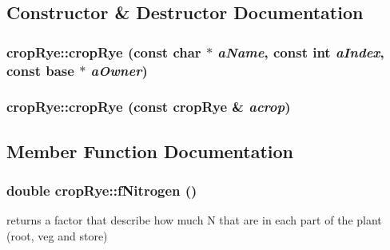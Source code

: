 \subsection{Constructor \& Destructor Documentation}
\hypertarget{classcrop_rye_a6f018fce527da6ab7f2100679d6e3077}{
\subsubsection[{cropRye}]{\setlength{\rightskip}{0pt plus 5cm}cropRye::cropRye (const char $\ast$ {\em aName}, \/  const int {\em aIndex}, \/  const {\bf base} $\ast$ {\em aOwner})}}
\label{classcrop_rye_a6f018fce527da6ab7f2100679d6e3077}
\hypertarget{classcrop_rye_a236684be4b8b349bf2a1e5917ed6660b}{
\subsubsection[{cropRye}]{\setlength{\rightskip}{0pt plus 5cm}cropRye::cropRye (const {\bf cropRye} \& {\em acrop})}}
\label{classcrop_rye_a236684be4b8b349bf2a1e5917ed6660b}


\subsection{Member Function Documentation}
\hypertarget{classcrop_rye_a2781d1b924cb3e3f9fba021a5052c629}{
\subsubsection[{fNitrogen}]{\setlength{\rightskip}{0pt plus 5cm}double cropRye::fNitrogen ()}}
\label{classcrop_rye_a2781d1b924cb3e3f9fba021a5052c629}
returns a factor that describe how much N that are in each part of the plant (root, veg and store) 

